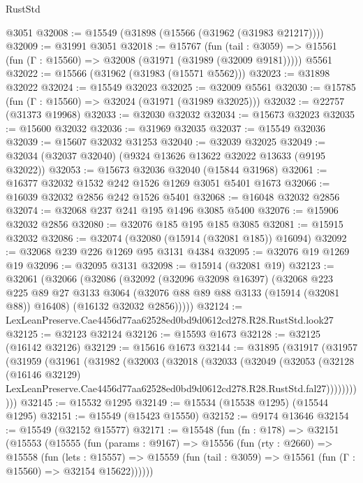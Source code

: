 \begin{lexlean}{RustStd}
\begin{coremodule}
    @3051
@32008 := @15549 (@31898 (@15566 (@31962 (@31983 @21217))))
@32009 := @31991 @3051
@32018 := @15767
    (fun (tail : @3059) => @15561 (fun (Γ : @15560) => @32008 (@31971 (@31989 (@32009 @9181)))))
    @5561
@32022 := @15566 (@31962 (@31983 (@15571 @5562)))
@32023 := @31898 @32022
@32024 := @15549 @32023
@32025 := @32009 @5561
@32030 := @15785 (fun (Γ : @15560) => @32024 (@31971 (@31989 @32025)))
@32032 := @22757 (@31373 @19968)
@32033 := @32030 @32032
@32034 := @15673 @32023
@32035 := @15600 @32032
@32036 := @31969 @32035
@32037 := @15549 @32036
@32039 := @15607 @32032 @31253
@32040 := @32039 @32025
@32049 := @32034 (@32037 @32040) (@9324 @13626 @13622 @32022 @13633 (@9195 @32022))
@32053 := @15673 @32036 @32040 (@15844 @31968)
@32061 := @16377 @32032 @1532 @242 @1526 @1269 @3051 @5401 @1673
@32066 := @16039 @32032 @2856 @242 @1526 @5401
@32068 := @16048 @32032 @2856
@32074 := @32068 @237 @241 @195 @1496 @3085 @5400
@32076 := @15906 @32032 @2856
@32080 := @32076 @185 @195 @185 @3085
@32081 := @15915 @32032
@32086 := @32074 (@32080 (@15914 (@32081 @185)) @16094)
@32092 := @32068 @239 @226 @1269 @95 @3131 @4384
@32095 := @32076 @19 @1269 @19
@32096 := @32095 @3131
@32098 := @15914 (@32081 @19)
@32123 := @32061
    (@32066
      (@32086
        (@32092
          (@32096 @32098 @16397)
          (@32068
            @223
            @225
            @89
            @27
            @3133
            @3064
            (@32076 @88 @89 @88 @3133 (@15914 (@32081 @88)) @16408)
            (@16132 @32032 @2856)))))
@32124 := LexLeanPreserve.Cae4456d77aa62528ed0bd9d0612cd278.R28.RustStd.look27
@32125 := @32123 @32124
@32126 := @15593 @1673
@32128 := @32125 (@16142 @32126)
@32129 := @15616 @1673
@32144 := @31895
    (@31917
      (@31957
        (@31959
          (@31961
            (@31982
              (@32003
                (@32018
                  (@32033
                    (@32049
                      (@32053
                        (@32128
                          (@16146 @32129)
                          LexLeanPreserve.Cae4456d77aa62528ed0bd9d0612cd278.R28.RustStd.fal27)))))))))))
@32145 := @15532 @1295
@32149 := @15534 (@15538 @1295) (@15544 @1295)
@32151 := @15549 (@15423 @15550)
@32152 := @9174 @13646
@32154 := @15549 (@32152 @15577)
@32171 := @15548
    (fun (fn : @178) =>
    @32151
      (@15553
        (@15555
          (fun (params : @9167) =>
          @15556
            (fun (rty : @2660) =>
            @15558
              (fun (lets : @15557) =>
              @15559 (fun (tail : @3059) => @15561 (fun (Γ : @15560) => @32154 @15622))))))

\end{coremodule}
\end{lexlean}
